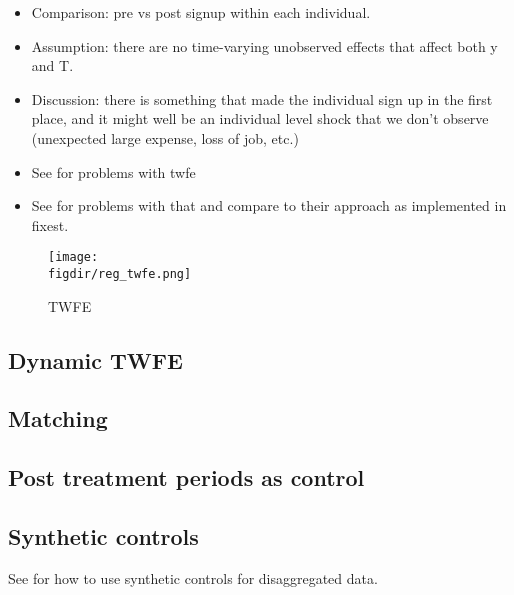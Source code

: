 \begin{itemize}

    \item Comparison: pre vs post signup within each individual.

    \item Assumption: there are no time-varying unobserved effects that affect
        both y and T.

    \item Discussion: there is something that made the individual sign up in
        the first place, and it might well be an individual level shock that we
        don't observe (unexpected large expense, loss of job, etc.)

    \item See \citet{imai2021use} for problems with twfe

    \item See \citet{sun2021estimating} for problems with that and compare to
        their approach as implemented in fixest.

\end{itemize}

\begin{figure}[htpb]
    \centering
    \caption{TWFE}%
    \texttt{[image: \\figdir/reg\_twfe.png]}
    \label{fig:reg_twfe}
\end{figure}


\subsection{Dynamic TWFE}%
\label{sub:dynamic_twfe}

\subsection{Matching}%
\label{sub:alternative_matching_method}

\subsection{Post treatment periods as control}%
\label{sub:post_treatment_periods_as_control}

\subsection{Synthetic controls}%
\label{sub:synthetic_controls}

See \citet{abadie2021penalized} for how to use synthetic controls for disaggregated data.


